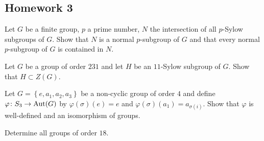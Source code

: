 \subsection{Homework 3}
\begin{problem}
  Let $G$ be a finite group, $p$ a prime number, $N$ the intersection of
  all $p$-Sylow subgroups of $G$. Show that $N$ is a normal $p$-subgroup of
  $G$ and that every normal $p$-subgroup of $G$ is contained in $N$.
\end{problem}
\begin{solution}
\end{solution}

\begin{problem}
  Let $G$ be a group of order $231$ and let $H$ be an $11$-Sylow subgroup
  of $G$. Show that $H\subset Z(G)$.
\end{problem}
\begin{solution}
\end{solution}

\begin{problem}
  Let $G=\left\{e,a_1,a_2,a_3\right\}$ be a non-cyclic group of order $4$
  and define $\varphi\colon S_3\to\operatorname{Aut}(G)$ by $\varphi(\sigma)(e)=e$ and
  $\varphi(\sigma)(a_1)=a_{\sigma(i)}$. Show that $\varphi$ is well-defined
  and an isomorphism of groups.
\end{problem}
\begin{solution}
\end{solution}

\begin{problem}
  Determine all groups of order $18$.
\end{problem}
\begin{solution}
\end{solution}

